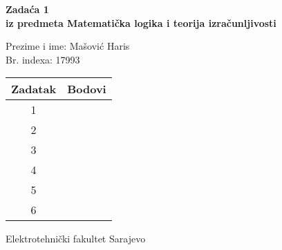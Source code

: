 \documentclass[12pt]{article}
\newcommand{\prezimeIme}{Mašović Haris}
\newcommand{\brIndexa}{17993}
\newcommand{\brZadace}{1}
\begin{document}
    
    \thispagestyle{empty}
    \begin{center}
      \vspace*{1cm}

      \vspace*{2cm}
      {\huge \bf Zadaća \brZadace } \\
      \vspace*{1cm}
      {\Large \bf iz predmeta Matematička logika i teorija izračunljivosti}

      \vspace*{2cm}

      {\Large Prezime i ime: \prezimeIme} \\
      \vspace*{0.75cm}
      {\Large Br. indexa: \brIndexa}

      \vspace*{3cm}
      \renewcommand{\arraystretch}{1.75}
      \begin{tabular}{|c|c|}
    	\hline Zadatak & Bodovi \\
    	\hline 1 &  \\
    	\hline 2 &  \\
    	\hline 3 &  \\
    	\hline 4 &  \\
    	\hline 5 &  \\
    	\hline 6 &  \\
    	\hline
     \end{tabular}

      \vfill


      {\large Elektrotehnički fakultet Sarajevo}

    \end{center}
    \newpage
    \thispagestyle{empty}
    
\end{document}
